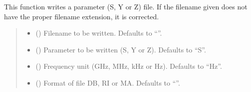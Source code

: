 \documentclass[letterpaper,10pt,english]{sphinxmanual}
\begin{document}
\begin{fulllineitems}
\begin{fulllineitems}
\label{\detokenize{touchstone:touchstone.spfile.write2file}}
\pysigstartsignatures
{}
\pysigstopsignatures
\sphinxAtStartPar
This function writes a parameter (S, Y or Z) file. If the filename given does not have the proper filename extension, it is corrected.
\begin{quote}\begin{description}
\begin{itemize}
\item {}
\sphinxAtStartPar
{} (\sphinxstyleliteralemphasis{\sphinxupquote{, }}) \textendash{} Filename to be written. Defaults to “”.

\item {}
\sphinxAtStartPar
{} (\sphinxstyleliteralemphasis{\sphinxupquote{, }}) \textendash{} Parameter to be written (S, Y or Z). Defaults to “S”.

\item {}
\sphinxAtStartPar
{} (\sphinxstyleliteralemphasis{\sphinxupquote{, }}) \textendash{} Frequency unit (GHz, MHz, kHz or Hz). Defaults to “Hz”.

\item {}
\sphinxAtStartPar
{} (\sphinxstyleliteralemphasis{\sphinxupquote{, }}) \textendash{} Format of file DB, RI or MA. Defaults to “”.

\end{itemize}

\end{description}\end{quote}

\end{fulllineitems}


\end{fulllineitems}
\end{document}
